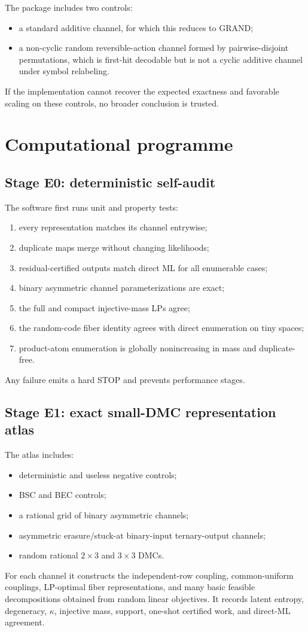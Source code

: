\documentclass[11pt]{article}
\theoremstyle{definition}
\theoremstyle{remark}
\begin{document}
The package includes two controls:
\begin{itemize}
\item a standard additive channel, for which this reduces to GRAND;
\item a non-cyclic random reversible-action channel formed by pairwise-disjoint permutations, which is first-hit decodable but is not a cyclic additive channel under symbol relabeling.
\end{itemize}
If the implementation cannot recover the expected exactness and favorable scaling on these controls, no broader conclusion is trusted.

\section{Computational programme}

\subsection{Stage E0: deterministic self-audit}

The software first runs unit and property tests:
\begin{enumerate}
\item every representation matches its channel entrywise;
\item duplicate maps merge without changing likelihoods;
\item residual-certified outputs match direct ML for all enumerable cases;
\item binary asymmetric channel parameterizations are exact;
\item the full and compact injective-mass LPs agree;
\item the random-code fiber identity agrees with direct enumeration on tiny spaces;
\item product-atom enumeration is globally nonincreasing in mass and duplicate-free.
\end{enumerate}
Any failure emits a hard STOP and prevents performance stages.

\subsection{Stage E1: exact small-DMC representation atlas}

The atlas includes:
\begin{itemize}
\item deterministic and useless negative controls;
\item BSC and BEC controls;
\item a rational grid of binary asymmetric channels;
\item asymmetric erasure/stuck-at binary-input ternary-output channels;
\item random rational $2\times3$ and $3\times3$ DMCs.
\end{itemize}
For each channel it constructs the independent-row coupling, common-uniform couplings, LP-optimal fiber representations, and many basic feasible decompositions obtained from random linear objectives. It records latent entropy, degeneracy, $\kappa$, injective mass, support, one-shot certified work, and direct-ML agreement.
\end{document}
